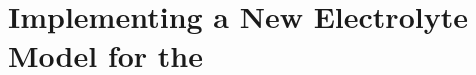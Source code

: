 
\clearpage
\chapter{Implementing a New Electrolyte Model for the }\label{ch:newelectrolytemodel}
\startcontents[chapters]

\graphicspath{{6/figures/}}

\bigskip



% 

% 

% 

% 

% 

